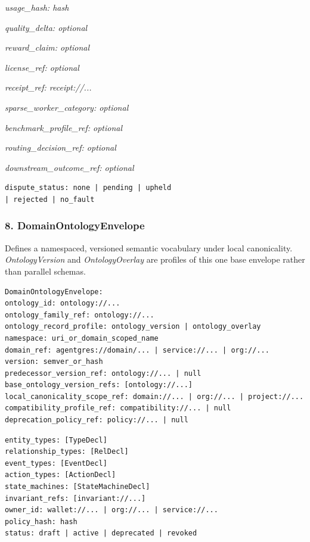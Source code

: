 \documentclass[
  11pt,
]{article}
\begin{document}
\emph{usage\_hash: hash}

\emph{quality\_delta: optional}

\emph{reward\_claim: optional}

\emph{license\_ref: optional}

\emph{receipt\_ref: receipt://...}

\emph{sparse\_worker\_category: optional}

\emph{benchmark\_profile\_ref: optional}

\emph{routing\_decision\_ref: optional}

\emph{downstream\_outcome\_ref: optional}

\begin{lstlisting}[language={},basicstyle=\ttfamily\scriptsize]
dispute_status: none | pending | upheld
| rejected | no_fault
\end{lstlisting}
\hypertarget{domainontologyenvelope}{%
\subsubsection{8. DomainOntologyEnvelope}\label{domainontologyenvelope}}

Defines a namespaced, versioned semantic vocabulary under local canonicality.
\emph{OntologyVersion} and \emph{OntologyOverlay} are profiles of this one
base envelope rather than parallel schemas.

\begin{lstlisting}[language=rustioi]
DomainOntologyEnvelope:
ontology_id: ontology://...
ontology_family_ref: ontology://...
ontology_record_profile: ontology_version | ontology_overlay
namespace: uri_or_domain_scoped_name
domain_ref: agentgres://domain/... | service://... | org://...
version: semver_or_hash
predecessor_version_ref: ontology://... | null
base_ontology_version_refs: [ontology://...]
local_canonicality_scope_ref: domain://... | org://... | project://...
compatibility_profile_ref: compatibility://... | null
deprecation_policy_ref: policy://... | null
\end{lstlisting}

\begin{lstlisting}[language={},basicstyle=\ttfamily\scriptsize]
entity_types: [TypeDecl]
relationship_types: [RelDecl]
event_types: [EventDecl]
action_types: [ActionDecl]
state_machines: [StateMachineDecl]
invariant_refs: [invariant://...]
owner_id: wallet://... | org://... | service://...
policy_hash: hash
status: draft | active | deprecated | revoked
\end{lstlisting}
\end{document}
